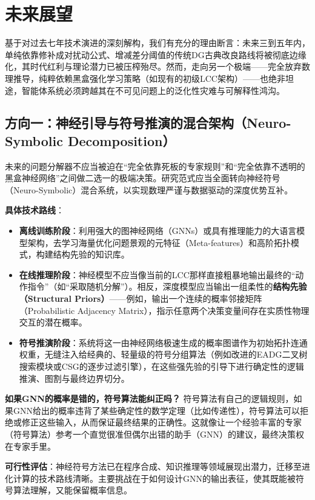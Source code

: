 \section{未来展望}
基于对过去七年技术演进的深刻解构，我们有充分的理由断言：未来三到五年内，单纯依靠修补成对扰动公式、增减差分阈值的传统DG古典改良路线将被彻底边缘化，其时代红利与理论潜力已被压榨殆尽。然而，走向另一个极端——完全放弃数理推导，纯粹依赖黑盒强化学习策略（如现有的初级LCC架构）——也绝非坦途，智能体系统必须跨越其在不可见问题上的泛化性灾难与可解释性鸿沟。

\subsection{方向一：神经引导与符号推演的混合架构（Neuro-Symbolic Decomposition）}
未来的问题分解器不应当被迫在“完全依靠死板的专家规则”和“完全依靠不透明的黑盒神经网络”之间做二选一的极端决策。研究范式应当全面转向神经符号（Neuro-Symbolic）混合系统，以实现数理严谨与数据驱动的深度优势互补。

\textbf{具体技术路线}：
\begin{itemize}
    \item \textbf{离线训练阶段}：利用强大的图神经网络（GNNs）或具有推理能力的大语言模型架构，去学习海量优化问题景观的元特征（Meta-features）和高阶拓扑模式，构建结构先验的知识库。
    \item \textbf{在线推理阶段}：神经模型不应当像当前的LCC那样直接粗暴地输出最终的“动作指令”（如“采取随机分解”）。相反，深度模型应当输出一组柔性的\textbf{结构先验（Structural Priors）}——例如，输出一个连续的概率邻接矩阵（Probabilistic Adjacency Matrix），指示任意两个决策变量间存在实质性物理交互的潜在概率。
    \item \textbf{符号推演阶段}：系统将这一由神经网络极速生成的概率图谱作为初始拓扑连通权重，无缝注入给经典的、轻量级的符号分组算法（例如改进的EADG二叉树搜索模块或CSG的逐步过滤引擎），在这些强先验的引导下进行确定性的逻辑推演、图割与最终边界切分。
\end{itemize}

\textbf{如果GNN的概率是错的，符号算法能纠正吗？} 符号算法有自己的逻辑规则，如果GNN给出的概率违背了某些确定性的数学定理（比如传递性），符号算法可以拒绝或修正这些输入，从而保证最终结果的正确性。这就像让一个经验丰富的专家（符号算法）参考一个直觉很准但偶尔出错的助手（GNN）的建议，最终决策权在专家手里。

\textbf{可行性评估}：神经符号方法已在程序合成、知识推理等领域展现出潜力，迁移至进化计算的技术路线清晰。主要挑战在于如何设计GNN的输出表征，使其既能被符号算法理解，又能保留概率信息。

